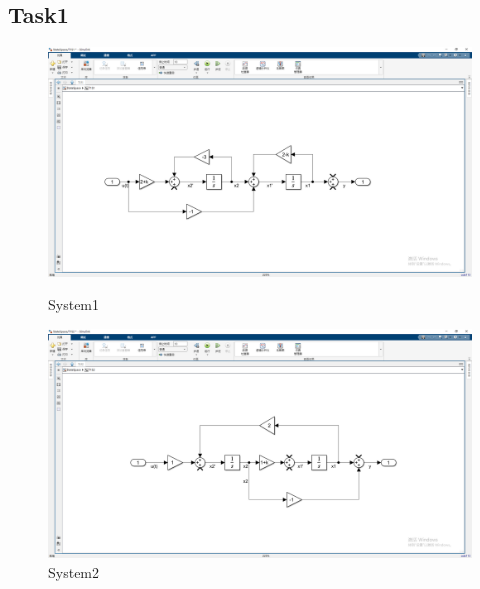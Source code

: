 \documentclass[12pt,a4paper,oneside]{ctexart}
\begin{document}
    \subsection{Task1}
    \newpage
    \begin{figure}[H]
        \includegraphics[height = 0.35\textheight]{../screenshots/MT1S1.PNG}
        \caption{System1}
        \includegraphics[height = 0.35\textheight]{../screenshots/MT1S2.PNG}
        \caption{System2}
    \end{figure}
    \newpage
\end{document}
